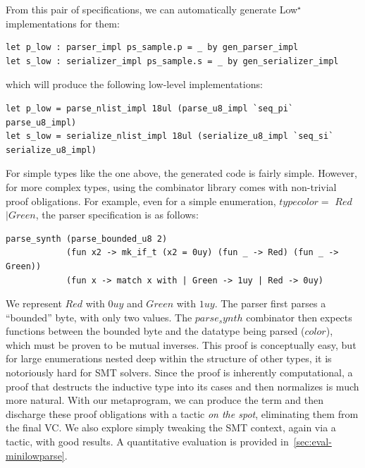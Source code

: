\documentclass[runningheads]{llncs}
\newcommand\lowstar{Low$^\star$\xspace}
\newcommand{\comm}[3]{\ifcheckpagebudget\else\ifdraft{{\color{#1}[#2: #3]}}\fi\fi}
\newcommand{\ch}[1]{\comm{teal}{CH}{#1}}
\begin{document}
From this pair of specifications, we can automatically generate \lowstar
implementations for them:
%
\begin{lstlisting}
let p_low : parser_impl ps_sample.p = _ by gen_parser_impl
let s_low : serializer_impl ps_sample.s = _ by gen_serializer_impl
\end{lstlisting}
%
which will produce the following low-level implementations:
%
\begin{lstlisting}
let p_low = parse_nlist_impl 18ul (parse_u8_impl `seq_pi` parse_u8_impl)
let s_low = serialize_nlist_impl 18ul (serialize_u8_impl `seq_si` serialize_u8_impl)
\end{lstlisting}
%
For simple types like the one above, the generated code is fairly
simple. However, for more complex types, using the combinator library
comes with non-trivial proof obligations. For example, even for a
simple enumeration, \ls$type color =$ \ls$ Red$ \ls$| Green$,
the parser specification is as follows:
%
\begin{lstlisting}
parse_synth (parse_bounded_u8 2)
            (fun x2 -> mk_if_t (x2 = 0uy) (fun _ -> Red) (fun _ -> Green))
            (fun x -> match x with | Green -> 1uy | Red -> 0uy)
\end{lstlisting}
%
We represent \ls$Red$ with \ls$0uy$ and \ls$Green$ with \ls$1uy$. The
parser first parses a ``bounded'' byte, with only two
values. The \ls$parse_synth$ combinator then expects functions between
the bounded byte and the datatype being parsed (\ls$color$), which
must be proven to be mutual inverses.
%
This proof is conceptually easy,
but for large enumerations nested deep within the structure of other
types, it is notoriously hard for SMT solvers.
%
Since the proof is
inherently computational, a proof that destructs the inductive type
into its cases and then normalizes is much more natural.
%
With our metaprogram, we can produce the term and then discharge
these proof obligations with a tactic \emph{on the spot},
eliminating them from the final VC.
%
We also explore simply tweaking the SMT context, again via a tactic,
with good results.
%
A quantitative evaluation is provided
in~\autoref{sec:eval-minilowparse}.

\end{document}

